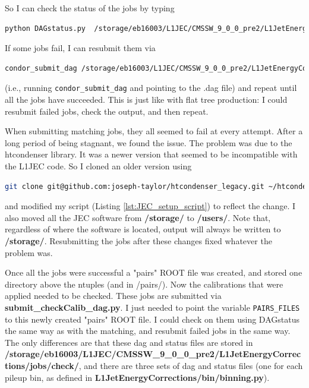 So I can check the status of the jobs by typing 

\begin{lstlisting}[belowskip=-0.7cm, language=sh, numbers=none]
python DAGstatus.py  /storage/eb16003/L1JEC/CMSSW_9_0_0_pre2/L1JetEnergyCorrections/jobs/pairs/<date>/matcher_102253_pCB.status
\end{lstlisting}

If some jobs fail, I can resubmit them via

\begin{lstlisting}[belowskip=-0.7cm, language=sh, numbers=none]
condor_submit_dag /storage/eb16003/L1JEC/CMSSW_9_0_0_pre2/L1JetEnergyCorrections/jobs/pairs/<date>/matcher_102253_pCB.dag
\end{lstlisting}

(i.e., running \texttt{condor\_submit\_dag} and pointing to the .dag file) and repeat until all the jobs have succeeded. This is just like with flat tree production: I could resubmit failed jobs, check the output, and then repeat.

When submitting matching jobs, they all seemed to fail at every attempt. After a long period of being stagnant, we found the issue. The problem was due to the htcondenser library. It was a newer version that seemed to be incompatible with the L1JEC code. So I cloned an older version using

\begin{lstlisting}[belowskip=-0.7cm, language=sh, numbers=none]
git clone git@github.com:joseph-taylor/htcondenser_legacy.git ~/htcondenser_legacy
\end{lstlisting}

and modified my script (Listing \ref{lst:JEC_setup_script}) to reflect the change. I also moved all the JEC software from \textbf{/storage/} to \textbf{/users/}. Note that, regardless of where the software is located, output will always be written to \textbf{/storage/}. Resubmitting the jobs after these changes fixed whatever the problem was.

Once all the jobs were successful a "pairs" ROOT file was created, and stored one directory above the ntuples (and in /pairs/). Now the calibrations that were applied needed to be checked. These jobs are submitted via \textbf{submit\_checkCalib\_dag.py}. I just needed to point the variable \texttt{PAIRS\_FILES} to this newly created "pairs" ROOT file. I could check on them using DAGstatus the same way as with the matching, and resubmit failed jobs in the same way. The only differences are that these dag and status files are stored in \textbf{/storage/eb16003/L1JEC/CMSSW\_9\_0\_0\_pre2/L1JetEnergyCorrections/jobs/check/}, and there are three sets of dag and status files (one for each pileup bin, as defined in \textbf{L1JetEnergyCorrections/bin/binning.py}).

